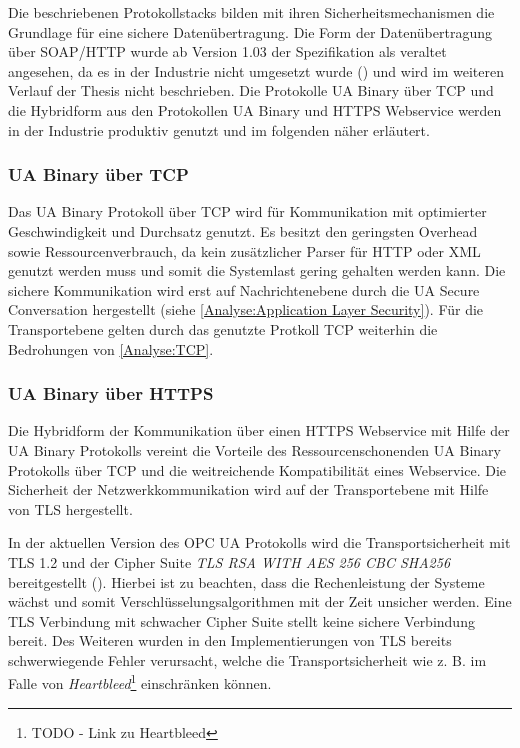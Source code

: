 Die beschriebenen Protokollstacks bilden mit ihren Sicherheitsmechanismen die Grundlage für eine sichere Datenübertragung. Die Form der Datenübertragung über \ac{SOAP}/\ac{HTTP} wurde ab Version 1.03 der Spezifikation als veraltet angesehen, da es in der Industrie nicht umgesetzt wurde (\cite{opcpt5}) und wird im weiteren Verlauf der Thesis nicht beschrieben. Die Protokolle \ac{UA} Binary über \ac{TCP} und die Hybridform aus den Protokollen \ac{UA} Binary und \ac{HTTPS} Webservice werden in der Industrie produktiv genutzt und im folgenden näher erläutert.

\subsubsection{\ac{UA} Binary über \ac{TCP}}
Das \ac{UA} Binary Protokoll über \ac{TCP} wird für Kommunikation mit optimierter Geschwindigkeit und Durchsatz genutzt. Es besitzt den geringsten Overhead sowie Ressourcenverbrauch, da kein zusätzlicher Parser für \ac{HTTP} oder \ac{XML} genutzt werden muss und somit die Systemlast gering gehalten werden kann. Die sichere Kommunikation wird erst auf Nachrichtenebene durch die \ac{UA} Secure Conversation hergestellt (siehe \autoref{Analyse:Application Layer Security}). Für die Transportebene gelten durch das genutzte Protkoll \ac{TCP} weiterhin die Bedrohungen von \autoref{Analyse:TCP}.

\subsubsection{\ac{UA} Binary über \ac{HTTPS}}
Die Hybridform der Kommunikation über einen \ac{HTTPS} Webservice mit Hilfe der \ac{UA} Binary Protokolls vereint die Vorteile des Ressourcenschonenden \ac{UA} Binary Protokolls über \ac{TCP} und die weitreichende Kompatibilität eines Webservice. Die Sicherheit der Netzwerkkommunikation wird auf der Transportebene mit Hilfe von \ac{TLS} hergestellt.

In der aktuellen Version des \ac{OPC UA} Protokolls wird die Transportsicherheit mit \ac{TLS} 1.2 und der Cipher Suite \textit{TLS RSA WITH AES 256 CBC SHA256} bereitgestellt (\cite{opcpt7}). Hierbei ist zu beachten, dass die Rechenleistung der Systeme wächst und somit Verschlüsselungsalgorithmen mit der Zeit unsicher werden. Eine \ac{TLS} Verbindung mit schwacher Cipher Suite stellt keine sichere Verbindung bereit. Des Weiteren wurden in den Implementierungen von \ac{TLS} bereits schwerwiegende Fehler verursacht, welche die Transportsicherheit wie z. B. im Falle von \textit{Heartbleed}\footnote{TODO - Link zu Heartbleed} einschränken können.

